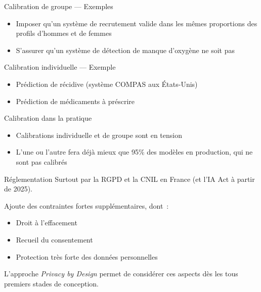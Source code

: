\begin{frame}{Calibration de groupe — Exemples}
  \begin{itemize}
    \item Imposer qu'un système de recrutement valide dans les mêmes proportions des profils d'hommes et de femmes
    \item S'assurer qu'un système de détection de manque d'oxygène ne soit pas 
  \end{itemize}
\end{frame}

\begin{frame}{Calibration individuelle — Exemple}
  \begin{itemize}
    \item Prédiction de récidive (système COMPAS aux États-Unis)
    \item Prédiction de médicaments à préscrire
  \end{itemize}
\end{frame}

\begin{frame}{Calibration dans la pratique}
  \begin{itemize}
    \item Calibrations individuelle et de groupe sont en tension
    \item L'une ou l'autre fera déjà mieux que 95\% des modèles en production, qui ne sont pas calibrés
  \end{itemize}
\end{frame}

\begin{frame}{Réglementation}
  Surtout par la RGPD et la CNIL en France (et l'IA Act à partir de 2025).

  Ajoute des contraintes fortes supplémentaires, dont~:

  \begin{itemize}
    \item Droit à l'effacement
    \item Recueil du consentement
    \item Protection très forte des données personnelles
  \end{itemize}

  L'approche \textit{Privacy by Design} permet de considérer ces aspects dès les tous premiers stades de conception.
\end{frame}

